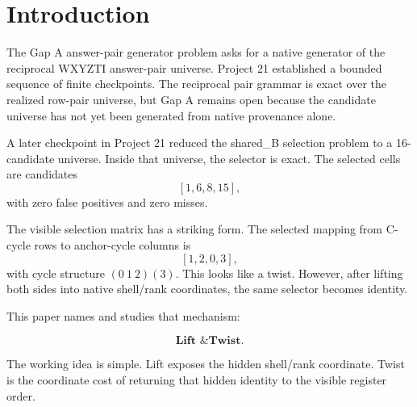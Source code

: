 \section{Introduction}

The Gap A answer-pair generator problem asks for a native generator of the reciprocal WXYZTI answer-pair universe.  Project 21 established a bounded sequence of finite checkpoints.  The reciprocal pair grammar is exact over the realized row-pair universe, but Gap A remains open because the candidate universe has not yet been generated from native provenance alone.

A later checkpoint in Project 21 reduced the shared\_B selection problem to a 16-candidate universe.  Inside that universe, the selector is exact.  The selected cells are candidates
\[
    [1,6,8,15],
\]
with zero false positives and zero misses.

The visible selection matrix has a striking form.  The selected mapping from C-cycle rows to anchor-cycle columns is
\[
    [1,2,0,3],
\]
with cycle structure \((0\ 1\ 2)(3)\).  This looks like a twist.  However, after lifting both sides into native shell/rank coordinates, the same selector becomes identity.

This paper names and studies that mechanism:

\[
    \textbf{Lift \& Twist}.
\]

The working idea is simple.  Lift exposes the hidden shell/rank coordinate.  Twist is the coordinate cost of returning that hidden identity to the visible register order.
